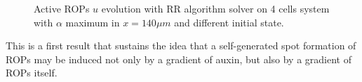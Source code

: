 \begin{figure}[H]
    \centering
    \quad
    \quad
    \quad
    \quad
    \caption[4cell RR Active ROPs - inverse gradient, different initial state]{Active ROPs $u$ evolution with RR algorithm solver on 4 cells system with $\alpha$ maximum in $x = 140 \mu m$ and different initial state.}
    \label{fig:4c_gradD_diffI}
\end{figure}
This is a first result that sustains the idea that a self-generated spot formation of ROPs may be induced not only by a gradient of auxin, but also by a gradient of ROPs itself.
%
%

